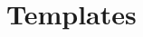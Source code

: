 \documentclass[oneside,11pt]{book}
\begin{document}
\begin{enumerate}
\end{enumerate}

\chapter{Templates}


%
%
\end{document}
